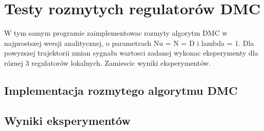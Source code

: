 \section{Testy rozmytych regulatorów DMC}
\label{lab:zad5}

W tym samym programie zaimplementowac rozmyty algorytm DMC w najprostszej
wersji analitycznej, o parametrach Nu = N = D i lambda = 1. Dla powyzszej trajektorii
zmian sygnału wartosci zadanej wykonac eksperymenty dla róznej 3 regulatorów
lokalnych. Zamiescic wyniki eksperymentów.

%    


\subsection{Implementacja rozmytego algorytmu DMC}
\label{lab:zad5:implDMC}


\newpage

\subsection{Wyniki eksperymentów}
\label{lab:zad5:eksperymenty}


\newpage
